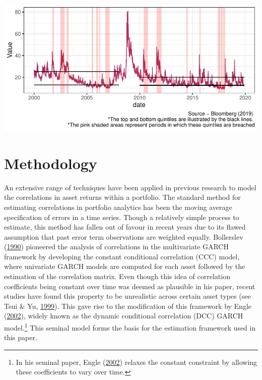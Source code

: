 \documentclass[11pt,preprint, authoryear]{elsarticle}
\let\origfigure\figure
\let\endorigfigure\endfigure
\renewenvironment{figure}[1][2] {
    \expandafter\origfigure\expandafter[H]
} {
    \endorigfigure
}
\numberwithin{equation}{section}
\numberwithin{figure}{section}
\numberwithin{table}{section}
\let\rmarkdownfootnote\footnote%
\def\footnote{\protect\rmarkdownfootnote}
\begin{document}
\begin{figure}[H]

{\centering \includegraphics{Template_files/figure-latex/figVIX-1} 

}

\caption{CBOE Volatility Index (VIX) \label{figVIX}}\label{fig:figVIX}
\end{figure}

\hypertarget{methodology}{%
\section{\texorpdfstring{Methodology
\label{Methodology}}{Methodology }}\label{methodology}}

An extensive range of techniques have been applied in previous research
to model the correlations in asset returns within a portfolio. The
standard method for estimating correlations in portfolio analytics has
been the moving average specification of errors in a time series. Though
a relatively simple process to estimate, this method has fallen out of
favour in recent years due to its flawed assumption that past error term
observations are weighted equally. Bollerslev
(\protect\hyperlink{ref-bollerslev1990modelling}{1990}) pioneered the
analysis of correlations in the multivariate GARCH framework by
developing the constant conditional correlation (CCC) model, where
univariate GARCH models are computed for each asset followed by the
estimation of the correlation matrix. Even though this idea of
correlation coefficients being constant over time was deemed as
plausible in his paper, recent studies have found this property to be
unrealistic across certain asset types (see Tsui \& Yu,
\protect\hyperlink{ref-tsui1999constant}{1999}). This gave rise to the
modification of this framework by Engle
(\protect\hyperlink{ref-engle2002dynamic}{2002}), widely known as the
dynamic conditional correlation (DCC) GARCH model.\footnote{In his
  seminal paper, Engle (\protect\hyperlink{ref-engle2002dynamic}{2002})
  relaxes the constant constraint by allowing these coefficients to vary
  over time.} This seminal model forms the basis for the estimation
framework used in this paper.
\end{document}
